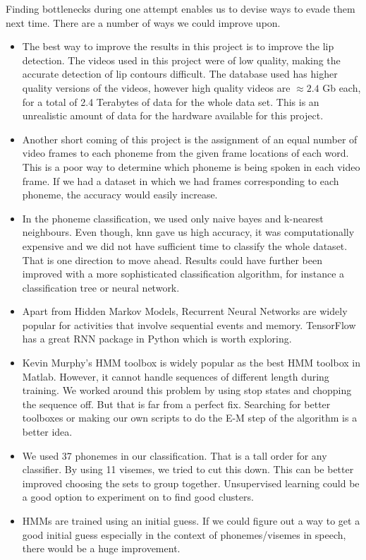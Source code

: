 \documentclass[a4paper]{article}
\begin{document}
Finding bottlenecks during one attempt enables us to devise ways to evade them next time. There are a number of ways we could improve upon.
\begin{itemize}
	\item The best way to improve the results in this project is to improve the lip detection.  The videos used in this project were of low quality, making the accurate detection of lip contours difficult.  The database used has higher quality versions of the videos, however high quality videos are $\approx 2.4$ Gb each, for a total of 2.4 Terabytes of data for the whole data set.  This is an unrealistic amount of data for the hardware available for this project.
	\item Another short coming of this project is the assignment of an equal number of video frames to each phoneme from the given frame locations of each word.  This is a poor way to determine which phoneme is being spoken in each video frame. If we had a dataset in which we had frames corresponding to each phoneme, the accuracy would easily increase.
	\item In the phoneme classification, we used only naive bayes and k-nearest neighbours. Even though, knn gave us high accuracy, it was computationally expensive and we did not have sufficient time to classify the whole dataset. That is one direction to move ahead. Results could have further been improved with a more sophisticated classification algorithm, for instance a classification tree or neural network.
	\item Apart from Hidden Markov Models, Recurrent Neural Networks are widely popular for activities that involve sequential events and memory. TensorFlow has a great RNN package in Python which is worth exploring.
	\item Kevin Murphy's HMM toolbox is widely popular as the best HMM toolbox in Matlab. However, it cannot handle sequences of different length during training. We worked around this problem by using stop states and chopping the sequence off. But that is far from a perfect fix. Searching for better toolboxes or making our own scripts to do the E-M step of the algorithm is a better idea. 
	\item We used 37 phonemes in our classification. That is a tall order for any classifier. By using 11 visemes, we tried to cut this down. This can be better improved choosing the sets to group together. Unsupervised learning could be a good option to experiment on to find good clusters.
	
	\item HMMs are trained using an initial guess. If we could figure out a way to get a good initial guess especially in the context of phonemes/visemes in speech, there would be a huge improvement.	
\end{itemize}
 
\end{document}
